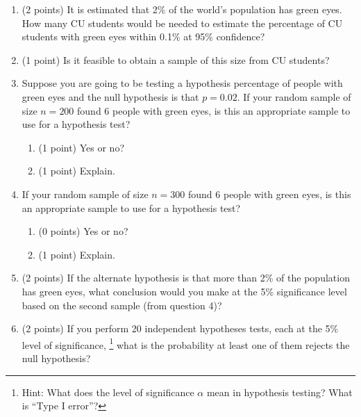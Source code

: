 \documentclass{ccg-topic}
\begin{document}
\begin{enumerate}

\item (2 points) It is estimated that 2\% of the world's population has green eyes. How many CU students would be needed to estimate the percentage of CU students with green eyes within 0.1\% at 95\% confidence? 

\vfill

\item (1 point) Is it feasible to obtain a sample of this size from CU students? 

\vfill

\item Suppose you are going to be testing a hypothesis percentage of people with green eyes and the null hypothesis is that $p=0.02$. If your random sample of size $n=200$ found 6 people with green eyes, is this an appropriate sample to use for a hypothesis test? 

\begin{enumerate}
\item (1 point) Yes or no? 

\vfill

\item (1 point) Explain.

\vfill
\end{enumerate}

\item If your random sample of size $n=300$ found 6 people with green eyes, is this an appropriate sample to use for a hypothesis test?

\begin{enumerate}
\item (0 points) Yes or no? 

\vfill

\item (1 point) Explain.

\vfill
\end{enumerate}

\item (2 points) If the alternate hypothesis is that more than 2\% of the population has green eyes, what conclusion would you make at the 5\% significance level based on the second sample (from question 4)?

\vfill

\item (2 points) If you perform 20 independent hypotheses tests, each at the 5\% level of significance,%
    \footnote{%
    Hint: What does the level of significance $\alpha$ mean in hypothesis testing? What is ``Type I error''? 
    }
what is the probability at least one of them rejects the null hypothesis?

\vfill
\end{enumerate}
\end{document}
